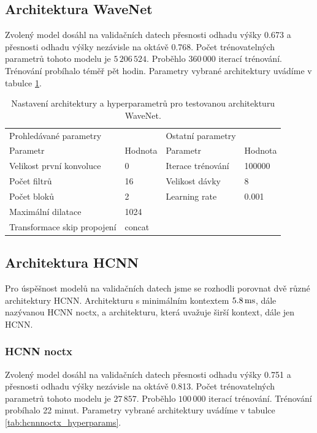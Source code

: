 \subsection{Architektura WaveNet}

Zvolený model dosáhl na validačních datech přesnosti odhadu výšky 0.673 a přesnosti odhadu výšky nezávisle na oktávě 0.768. Počet trénovatelných parametrů tohoto modelu je $5\,206\,524$. Proběhlo $360\,000$ iterací trénování. Trénování probíhalo téměř pět hodin. Parametry vybrané architektury uvádíme v tabulce \ref{tab:wavenet_hyperparams}.

\begin{table}[p]
\centering
\begin{tabular}{llll}
\toprule
Prohledávané parametry               &          & Ostatní parametry &         \\
Parametr                             & Hodnota  & Parametr          & Hodnota \\
\midrule
Velikost první konvoluce & 0      & Iterace trénování     & 100000 \\
Počet filtrů  & 16     & Velikost dávky    & 8      \\
Počet bloků            & 2     & Learning rate & 0.001       \\
Maximální dilatace         & 1024   &                &        \\
Transformace skip propojení & concat &                &        \\
\bottomrule
\end{tabular}
\caption{Nastavení architektury a hyperparametrů pro testovanou architekturu WaveNet.}\label{tab:wavenet_hyperparams}
\end{table}

\subsection{Architektura HCNN}

Pro úspěšnost modelů na validačních datech jsme se rozhodli porovnat dvě různé architektury HCNN. Architekturu s minimálním kontextem $5.8\,\rm ms$, dále nazývanou HCNN noctx, a architekturu, která uvažuje širší kontext, dále jen HCNN.

\subsubsection{HCNN noctx}

Zvolený model dosáhl na validačních datech přesnosti odhadu výšky 0.751 a přesnosti odhadu výšky nezávisle na oktávě 0.813. Počet trénovatelných parametrů tohoto modelu je $27\,857$. Proběhlo $100\,000$ iterací trénování. Trénování probíhalo 22 minut. Parametry vybrané architektury uvádíme v tabulce \ref{tab:hcnnnoctx_hyperparams}.


